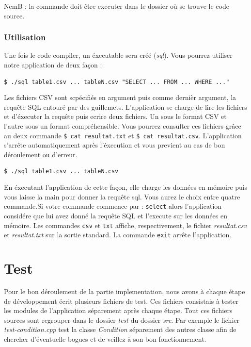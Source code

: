 \documentclass[oneside,13pt,a4paper]{report}
\newcommand\nb[1][0.3]{N\kern-#1emB : }
\begin{document}
\nb la commande doit être executer dans le dossier où se trouve le code source.

\subsubsection{Utilisation}

Une fois le code compiler, un éxecutable sera créé (\textit{sql}). Vous pourrez utiliser notre application de deux façon :

\texttt{\$ ./sql table1.csv ... tableN.csv "SELECT ... FROM ... WHERE ..."}

Les fichiers CSV sont scpécifiés en argument puis comme dernièr argument, la requête SQL entouré par des guillemets. L'application se charge de lire les fichiers et d'éxecuter la requête puis ecrire deux fichiers. Un sous le format CSV et l'autre sous un format compréhensible. Vous pourrez consulter ces fichiers grâce au deux commande \texttt{\$ cat resultat.txt} et \texttt{\$ cat resultat.csv}. L'application s'arrête automatiquement après l'éxecution et vous previent au cas de bon déroulement ou d'erreur.

\texttt{\$ ./sql table1.csv ... tableN.csv}

En éxecutant l'application de cette façon, elle charge les données en mémoire puis vous laisse la main pour donner la requête sql. Vous aurez le choix entre quatre commande.Si votre commande commence par : \texttt{select} alors l'application considére que lui avez donné la requête SQL et l'execute sur les données en mémoire. Les commandes \texttt{csv} et \texttt{txt} affiche, respectivement, le fichier \textit{resultat.csv} et \textit{resultat.txt} sur la sortie standard. La commande \texttt{exit} arrête l'application.

\section{Test}

Pour le bon déroulement de la partie implementation, nous avons à chaque étape de développement écrit plusieurs fichiers de test. Ces fichiers consistais à tester les modules de l'application séparement après chaque étape. Tout ces fichiers sources sont regrouper dans le dossier \textit{test} du dossier \textit{src}. Par exemple le fichier \textit{test-condition.cpp} test la classe \textit{Condition} séparement des autres classe afin de chercher d'éventuelle bogues et de veillez à son bon fonctionnement.
\end{document}
